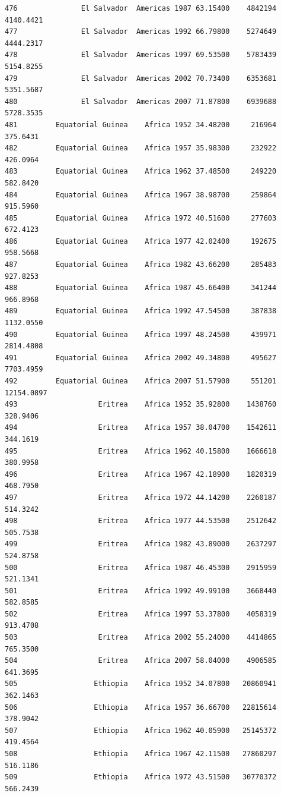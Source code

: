 \documentclass[
  letterpaper,
  DIV=11,
  numbers=noendperiod]{scrreprt}
\begin{document}
\begin{verbatim}
476               El Salvador  Americas 1987 63.15400    4842194   4140.4421
477               El Salvador  Americas 1992 66.79800    5274649   4444.2317
478               El Salvador  Americas 1997 69.53500    5783439   5154.8255
479               El Salvador  Americas 2002 70.73400    6353681   5351.5687
480               El Salvador  Americas 2007 71.87800    6939688   5728.3535
481         Equatorial Guinea    Africa 1952 34.48200     216964    375.6431
482         Equatorial Guinea    Africa 1957 35.98300     232922    426.0964
483         Equatorial Guinea    Africa 1962 37.48500     249220    582.8420
484         Equatorial Guinea    Africa 1967 38.98700     259864    915.5960
485         Equatorial Guinea    Africa 1972 40.51600     277603    672.4123
486         Equatorial Guinea    Africa 1977 42.02400     192675    958.5668
487         Equatorial Guinea    Africa 1982 43.66200     285483    927.8253
488         Equatorial Guinea    Africa 1987 45.66400     341244    966.8968
489         Equatorial Guinea    Africa 1992 47.54500     387838   1132.0550
490         Equatorial Guinea    Africa 1997 48.24500     439971   2814.4808
491         Equatorial Guinea    Africa 2002 49.34800     495627   7703.4959
492         Equatorial Guinea    Africa 2007 51.57900     551201  12154.0897
493                   Eritrea    Africa 1952 35.92800    1438760    328.9406
494                   Eritrea    Africa 1957 38.04700    1542611    344.1619
495                   Eritrea    Africa 1962 40.15800    1666618    380.9958
496                   Eritrea    Africa 1967 42.18900    1820319    468.7950
497                   Eritrea    Africa 1972 44.14200    2260187    514.3242
498                   Eritrea    Africa 1977 44.53500    2512642    505.7538
499                   Eritrea    Africa 1982 43.89000    2637297    524.8758
500                   Eritrea    Africa 1987 46.45300    2915959    521.1341
501                   Eritrea    Africa 1992 49.99100    3668440    582.8585
502                   Eritrea    Africa 1997 53.37800    4058319    913.4708
503                   Eritrea    Africa 2002 55.24000    4414865    765.3500
504                   Eritrea    Africa 2007 58.04000    4906585    641.3695
505                  Ethiopia    Africa 1952 34.07800   20860941    362.1463
506                  Ethiopia    Africa 1957 36.66700   22815614    378.9042
507                  Ethiopia    Africa 1962 40.05900   25145372    419.4564
508                  Ethiopia    Africa 1967 42.11500   27860297    516.1186
509                  Ethiopia    Africa 1972 43.51500   30770372    566.2439

\end{verbatim}
\end{document}
